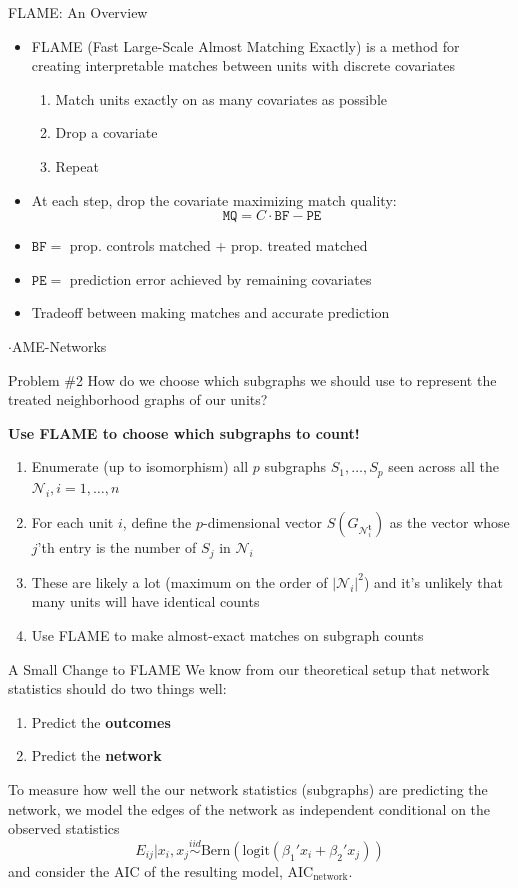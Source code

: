 \documentclass[newPxFont,numfooter,sectionpages]{beamer}
\begin{document}
\begin{frame}{FLAME: An Overview}
	\begin{itemize}
		\item FLAME (Fast Large-Scale Almost Matching Exactly) is a method for creating interpretable matches between units with discrete covariates
		\begin{enumerate}
			\item Match units exactly on as many covariates as possible
			\item Drop a covariate
			\item Repeat
		\end{enumerate}
		\item At each step, drop the covariate maximizing match quality:
		\[\mathtt{MQ} = C \cdot \mathtt{BF} - \mathtt{PE}\]
		\item $\mathtt{BF} = $ prop. controls matched + prop. treated matched
		\item $\mathtt{PE} = $ prediction error achieved by remaining covariates
		\item Tradeoff between making matches and accurate prediction
	\end{itemize}
\end{frame}
\begin{frame}{$\cdot$AME-Networks}
\begin{alertblock}{Problem \#2}
How do we choose which subgraphs we should use to represent the treated neighborhood graphs of our units?
\end{alertblock}
\textbf{Use FLAME to choose which subgraphs to count!}
\begin{enumerate}
	\item Enumerate (up to isomorphism) all $p$ subgraphs $S_1, \dots, S_p$ seen across all the $\mathcal{N}_i, i = 1, \dots, n$
  \item For each unit $i$, define the $p$-dimensional vector $S(G_{\mathcal{N}_i^{\mathbf{t}}})$ as the vector whose $j$'th entry is the number of $S_j$ in $\mathcal{N}_i$
  \item These are likely a lot (maximum on the order of $|\mathcal{N}_i|^2$) and it's unlikely that many units will have identical counts
  \item Use FLAME to make almost-exact matches on subgraph counts 
\end{enumerate}
\end{frame}
\begin{frame}{A Small Change to FLAME}
We know from our theoretical setup that network statistics should do two things well:
\begin{enumerate}
  \item Predict the \textbf{outcomes}
  \item Predict the \textbf{network}
\end{enumerate}
To measure how well the our network statistics (subgraphs) are predicting the network, we model the edges of the network as independent conditional on the observed statistics
\[E_{ij}|x_i, x_j \stackrel{iid}{\sim} \textrm{Bern}(\textrm{logit}(\beta_1'x_i + \beta_2'x_j))\]
and consider the AIC of the resulting model, $\text{AIC}_{\text{network}}$. 
\end{frame}
\end{document}
